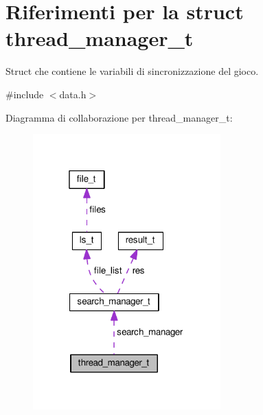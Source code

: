 \hypertarget{structthread__manager__t}{}\section{Riferimenti per la struct thread\+\_\+manager\+\_\+t}
\label{structthread__manager__t}


Struct che contiene le variabili di sincronizzazione del gioco.  




{\ttfamily \#include $<$data.\+h$>$}



Diagramma di collaborazione per thread\+\_\+manager\+\_\+t\+:\nopagebreak
\begin{figure}[H]
\begin{center}
\leavevmode
\includegraphics[width=205pt]{d8/df3/structthread__manager__t__coll__graph}
\end{center}
\end{figure}
